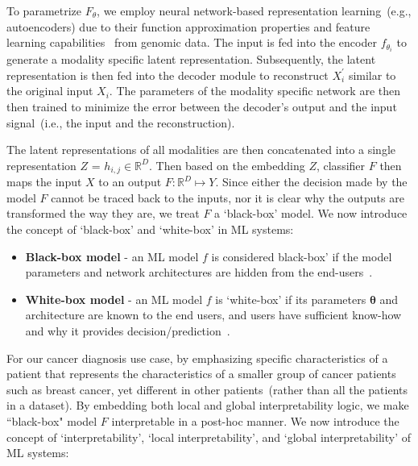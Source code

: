 \hspace*{3.5mm} To parametrize $F_{\theta}$, we employ neural network-based representation learning~(e.g., autoencoders) due to their function approximation properties and feature learning capabilities~\cite{xie2016unsupervised} from genomic data. The input is fed into the encoder $f_{\theta_{i}}$ to generate a modality specific latent representation. Subsequently, the latent representation is then fed into the decoder module to reconstruct ${X}_{i}^{\prime}$ similar to the original input $X_i$. The parameters of the modality specific network are then then trained to minimize the error between the decoder’s output and the input signal~(i.e., the input and the reconstruction). 

\hspace*{3.5mm} The latent representations of all modalities are then concatenated into a single representation $Z$ = $h_{i,j} \in \mathbb{R}^{D}$. Then based on the embedding $Z$, classifier $F$ then maps the input $X$ to an output $F: \mathbb{R}^{D} \mapsto Y$. Since either the decision made by the model $F$ cannot be traced back to the inputs, nor it is clear why the outputs are transformed the way they are, we treat $F$ a `black-box' model. We now introduce the concept of `black-box' and `white-box' in ML systems:   

\begin{itemize}[noitemsep]
    \item \textbf{Black-box model} - an ML model $f$ is considered black-box' if the model parameters and network architectures are hidden from the end-users~\cite{das2020opportunities}. 
    \item \textbf{White-box model} - an ML model $f$ is `white-box' if its parameters $\boldsymbol{\theta}$ and architecture are known to the end users, and users have sufficient know-how and why it provides decision/prediction~\cite{das2020opportunities}.  
\end{itemize}

\hspace*{3.5mm} For our cancer diagnosis use case, by emphasizing specific characteristics of a patient that represents the characteristics of a smaller group of cancer patients such as breast cancer, yet different in other patients~(rather than all the patients in a dataset). By embedding both local and global interpretability logic, we make ``black-box" model $F$ interpretable in a post-hoc manner. We now introduce the concept of `interpretability', `local interpretability', and `global interpretability' of ML systems: 


